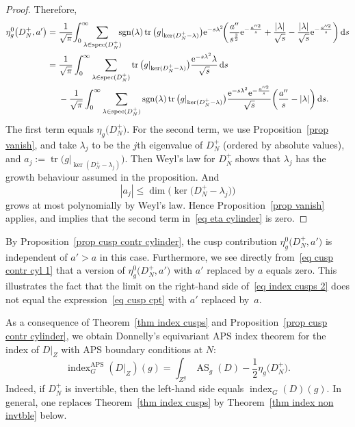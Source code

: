 \documentclass[10pt,a4paper]{amsart}
\numberwithin{equation}{section}
\DeclareMathOperator{\tr}{tr}
\DeclareMathOperator{\spec}{spec}
\DeclareMathOperator{\AS}{AS}
\DeclareMathOperator{\APS}{APS}
\DeclareMathOperator{\ind}{index}
\DeclareMathOperator{\sgn}{sgn}
\begin{document}
\begin{proof}
Therefore,
\begin{align}
\eta^{0}_g\big(D_N^+, a'\big)={}&\frac{1}{\sqrt{\pi}}\! \int_{0}^{\infty}\!\!\!\!\!
\sum_{\lambda \in \spec(D_N^+)}\!\!\! \sgn(\lambda)\tr\big(g|_{\ker(D_N^+ - \lambda)}\big)
{\rm e}^{-s\lambda^2}\!
 \bigg( \frac{a''}{s^{\frac32}}{\rm e}^{-\frac{a''^2}{s}}+\frac{|\lambda|}{\sqrt{ s}}-\frac{|\lambda|}{\sqrt{ s}}{\rm e}^{-\frac{a''^2}{s}} \bigg) \, {\rm d}s\nonumber
 \\
={}& \frac{1}{\sqrt{\pi}}\int_{0}^{\infty}
\sum_{\lambda\in\spec(D_N^+)} \tr\big(g|_{\ker(D_N^+ - \lambda)}\big) \frac{{\rm e}^{-s\lambda^2}\lambda}{\sqrt{s}}\, {\rm d}s \nonumber
\\
& -\frac{1}{\sqrt{\pi}} \int_0^{\infty} \sum_{\lambda\in\spec(D_N^+)}\sgn(\lambda)\tr\big(g|_{\ker(D_N^+ - \lambda)}\big)\frac{{\rm e}^{-s\lambda^2}{\rm e}^{-\frac{a''^2}{s}}}{\sqrt{s}}\bigg(\frac{a''}{s}-|\lambda|\bigg)\, {\rm d}s. \!\!\label{eq eta cylinder}
\end{align}
The first term equals $\eta_g\big(D_N^+\big)$. For the second term, we
use Proposition~\ref{prop vanish},
and take $\lambda_j$ to be the $j$th eigenvalue of $D_N^+$ (ordered by absolute values), and $a_j := \tr\big(g|_{\ker(D_N^+ - \lambda_j)}\big)$.
Then Weyl's law for $D_N^+$ shows that $\lambda_j$ has the growth behaviour assumed in the proposition. And
\[
|a_j| \leq \dim\big(\ker\big(D_N^+ - \lambda_j\big)\big)
\]
grows at most polynomially by Weyl's law.
Hence Proposition~\ref{prop vanish} applies, and implies that the second term in~\eqref{eq eta cylinder} is zero.
\end{proof}

\begin{Remark}\label{rem cyl zero at a}
By Proposition~\ref{prop cusp contr cylinder}, the cusp contribution $\eta^{0}_g\big(D_N^+, a'\big)$ is independent of $a'>a$ in this case. Furthermore, we see directly from~\eqref{eq cusp contr cyl 1} that a version of $\eta^{0}_g\big(D_N^+, a'\big)$ with $a'$ replaced by $a$ equals zero. This illustrates the fact that the limit on the right-hand side of~\eqref{eq index cusps 2} does not equal the expression~\eqref{eq cusp cpt} with $a'$ replaced by~$a$.
\end{Remark}

As a consequence of Theorem~\ref{thm index cusps} and Proposition~\ref{prop cusp contr cylinder}, we obtain Donnelly's equivariant APS index theorem \cite{Donnelly} for the index of $D|_Z$ with APS boundary conditions at $N$:
\[
\ind_G^{\APS}(D|_Z)(g) = \int_{Z^g} \AS_g(D) -\frac{1}{2}\eta_g\big(D_N^+\big).
\]
Indeed, if $D_N^+$ is invertible, then the left-hand side equals $\ind_G(D)(g)$. In general, one replaces Theorem~\ref{thm index cusps} by Theorem~\ref{thm index non invtble} below.
\end{document}

